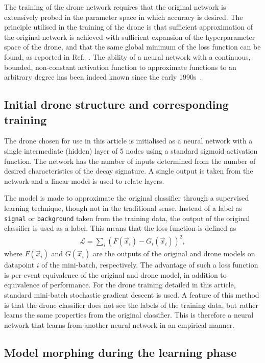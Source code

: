\documentclass[final,5p,times,twocolumn]{elsarticle}
\begin{document}
The training of the drone network requires that the original network is
extensively probed in the parameter space in which accuracy is desired.
The principle utilised in the training of the drone is that sufficient
approximation of the original network is achieved with sufficient expansion
of the hyperparameter space of the drone, and that the same global minimum
of the loss function can be found, as reported in Ref.~\cite{losssurfaces}.
The ability of a neural network with a continuous, bounded, non-constant activation
function to approximate functions to an arbitrary degree has been indeed known
since the early 1990s~\cite{HORNIK1991251}.

\subsection{Initial drone structure and corresponding training}

The drone chosen for use in this article is initialised as a
neural network with a single intermediate (hidden) layer of 5
nodes using a standard sigmoid activation function. The network
has the number of inputs determined from the number of desired
characteristics of the decay signature. A single output is taken
from the network and a linear model is used to relate layers.

The model is made to approximate the original classifier through
a supervised learning technique, though not in the traditional sense.
Instead of a label as {\tt signal} or {\tt background} taken from the training data, the
output of the original classifier is used as a label. This means that the
loss function is defined as
\begin{align}
\mathcal{L} = \sum_i \left( F(\vec{x}_i) - G_i(\vec{x}_i) \right)^2,
\end{align}
where $F(\vec{x}_i)$ and $G(\vec{x}_i)$ are the outputs
of the original and drone models on datapoint
$i$ of the mini-batch, respectively. The advantage of such a loss function is per-event
equivalence of the original and drone model, in addition to equivalence
of performance. For the drone training detailed in this article, standard
mini-batch stochastic gradient descent is used. A feature of this method
is that the drone classifier does not see the labels of the training data,
but rather learns the same properties from the original classifier.
This is therefore a neural network that learns from another neural network in an
empirical manner.

\subsection{Model morphing during the learning phase}
\end{document}
